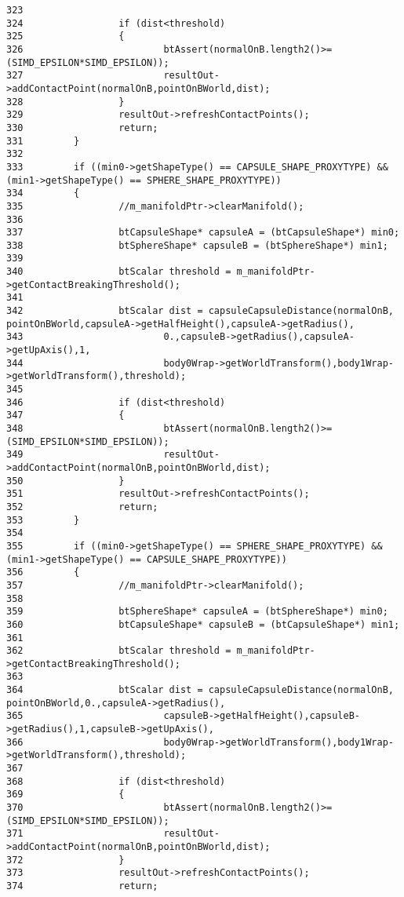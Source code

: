 \begin{Code}
\begin{verbatim}
323 
324                 if (dist<threshold)
325                 {
326                         btAssert(normalOnB.length2()>=(SIMD_EPSILON*SIMD_EPSILON));
327                         resultOut->addContactPoint(normalOnB,pointOnBWorld,dist);       
328                 }
329                 resultOut->refreshContactPoints();
330                 return;
331         }
332 
333         if ((min0->getShapeType() == CAPSULE_SHAPE_PROXYTYPE) && (min1->getShapeType() == SPHERE_SHAPE_PROXYTYPE))
334         {
335                 //m_manifoldPtr->clearManifold();
336 
337                 btCapsuleShape* capsuleA = (btCapsuleShape*) min0;
338                 btSphereShape* capsuleB = (btSphereShape*) min1;
339                 
340                 btScalar threshold = m_manifoldPtr->getContactBreakingThreshold();
341 
342                 btScalar dist = capsuleCapsuleDistance(normalOnB,       pointOnBWorld,capsuleA->getHalfHeight(),capsuleA->getRadius(),
343                         0.,capsuleB->getRadius(),capsuleA->getUpAxis(),1,
344                         body0Wrap->getWorldTransform(),body1Wrap->getWorldTransform(),threshold);
345 
346                 if (dist<threshold)
347                 {
348                         btAssert(normalOnB.length2()>=(SIMD_EPSILON*SIMD_EPSILON));
349                         resultOut->addContactPoint(normalOnB,pointOnBWorld,dist);       
350                 }
351                 resultOut->refreshContactPoints();
352                 return;
353         }
354 
355         if ((min0->getShapeType() == SPHERE_SHAPE_PROXYTYPE) && (min1->getShapeType() == CAPSULE_SHAPE_PROXYTYPE))
356         {
357                 //m_manifoldPtr->clearManifold();
358 
359                 btSphereShape* capsuleA = (btSphereShape*) min0;
360                 btCapsuleShape* capsuleB = (btCapsuleShape*) min1;
361                 
362                 btScalar threshold = m_manifoldPtr->getContactBreakingThreshold();
363 
364                 btScalar dist = capsuleCapsuleDistance(normalOnB,       pointOnBWorld,0.,capsuleA->getRadius(),
365                         capsuleB->getHalfHeight(),capsuleB->getRadius(),1,capsuleB->getUpAxis(),
366                         body0Wrap->getWorldTransform(),body1Wrap->getWorldTransform(),threshold);
367 
368                 if (dist<threshold)
369                 {
370                         btAssert(normalOnB.length2()>=(SIMD_EPSILON*SIMD_EPSILON));
371                         resultOut->addContactPoint(normalOnB,pointOnBWorld,dist);       
372                 }
373                 resultOut->refreshContactPoints();
374                 return;

\end{verbatim}
\end{Code}
